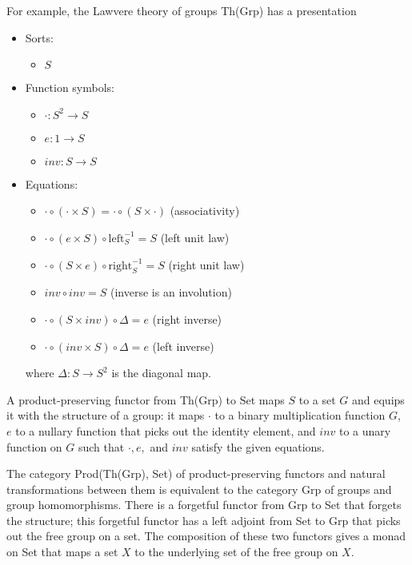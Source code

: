 \documentclass{article}
\newcommand{\maps}{\colon}
\begin{document}
For example, the Lawvere theory of groups Th(Grp) has a presentation
\begin{center}
  \begin{itemize}
    \item Sorts:
    \begin{itemize}
      \item $S$
    \end{itemize}
    \item Function symbols:
    \begin{itemize}
      \item $\cdot\maps S^2 \to S$
      \item $e\maps 1 \to S$
      \item $inv \maps S \to S$
    \end{itemize}
    \item Equations:
    \begin{itemize}
      \item $\cdot \circ (\cdot \times S) = \cdot \circ (S \times \cdot)$ (associativity)
      \item $\cdot \circ (e \times S) \circ \mathrm{left}^{-1}_S = S$ (left unit law)
      \item $\cdot \circ (S \times e) \circ \mathrm{right}^{-1}_S = S$ (right unit law)
      \item $inv \circ inv = S$ (inverse is an involution)
      \item $\cdot \circ (S \times inv) \circ \Delta = e$ (right inverse)
      \item $\cdot \circ (inv \times S) \circ \Delta = e$ (left inverse)
    \end{itemize}
    where ${\Delta\maps S \to S^2}$ is the diagonal map.
  \end{itemize}
\end{center}

A product-preserving functor from Th(Grp) to Set maps $S$ to a set $G$ and equips it with the structure of a group: it maps $\cdot$ to a binary multiplication function $G$, $e$ to a nullary function that picks out the identity element, and $inv$ to a unary function on $G$ such that $\cdot, e,$ and $inv$ satisfy the given equations.

The category Prod(Th(Grp), Set) of product-preserving functors and natural transformations between them is equivalent to the category Grp of groups and group homomorphisms.  There is a forgetful functor from Grp to Set that forgets the structure; this forgetful functor has a left adjoint from Set to Grp that picks out the free group on a set.  The composition of these two functors gives a monad on Set that maps a set $X$ to the underlying set of the free group on $X.$
\end{document}
